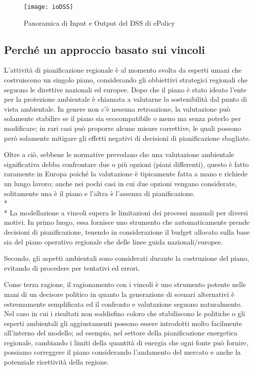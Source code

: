 \begin{figure}[h]
	\centering
	\texttt{[image: ioDSS]}
	\caption{Panoramica di Input e Output del DSS di ePolicy}
	\label{ioDSS}
\end{figure}

\subsection[Approccio a vincoli]{\nohyphens{Perché un approccio basato sui vincoli}}
L'attività di pianificazione regionale è al momento svolta da esperti umani che costruiscono un singolo piano, considerando gli obbiettivi strategici regionali che seguono le direttive nazionali ed europee. Dopo che il piano è stato ideato l'ente per la protezione ambientale è chiamata a valutarne la sostenibilità dal punto di vista ambientale. In genere non c'è nessuna retroazione, la valutazione può solamente stabilire se il piano sia ecocompatibile o meno ma senza poterlo per modificare; in rari casi può proporre alcune misure correttive, le quali possono però solamente mitigare gli effetti negativi di decisioni di pianificazione sbagliate.

Oltre a ciò, sebbene le normative prevedano che una valutazione ambientale significativa debba confrontare due o più opzioni (piani differenti), questo è fatto raramente in Europa poiché la valutazione è tipicamente fatta a mano e richiede un lungo lavoro; anche nei pochi casi in cui due opzioni vengano considerate, solitamente una è il piano e l'altra è l'assenza di pianificazione.\\*\\*
La modellazione a vincoli supera le limitazioni dei processi manuali per diversi motivi. In primo luogo, essa fornisce uno strumento che automaticamente prende decisioni di pianificazione, tenendo in considerazione il budget allocato sulla base sia del piano operativo regionale che delle linee guida nazionali/europee.

Secondo, gli aspetti ambientali sono considerati durante la costruzione del piano, evitando di procedere per tentativi ed errori.

Come terza ragione, il ragionamento con i vincoli è uno strumento potente nelle mani di un decisore politico in quanto la generazione di scenari alternativi è estremamente semplificata ed il confronto e valutazione seguono naturalmente. Nel caso in cui i risultati non soddisfino coloro che stabiliscono le politiche o gli esperti ambientali gli aggiustamenti possono essere introdotti molto facilmente all'interno del modello; ad esempio, nel settore della pianificazione energetica regionale, cambiando i limiti della quantità di energia che ogni fonte può fornire, possiamo correggere il piano considerando l'andamento del mercato e anche la potenziale ricettività della regione.


